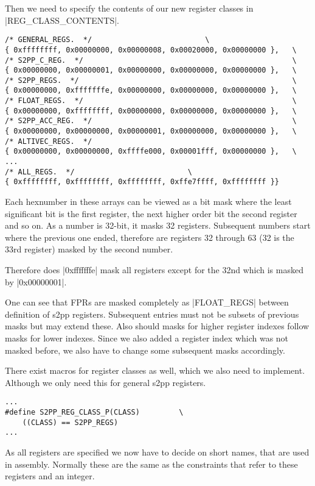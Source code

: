 Then we need to specify the contents of our new register classes in |REG_CLASS_CONTENTS|.
\begin{lstlisting}
/* GENERAL_REGS.  */                          \
{ 0xffffffff, 0x00000000, 0x00000008, 0x00020000, 0x00000000 },   \
/* S2PP_C_REG.  */                                                \
{ 0x00000000, 0x00000001, 0x00000000, 0x00000000, 0x00000000 },   \
/* S2PP_REGS.  */                                                 \
{ 0x00000000, 0xfffffffe, 0x00000000, 0x00000000, 0x00000000 },   \
/* FLOAT_REGS.  */                                                \
{ 0x00000000, 0xffffffff, 0x00000000, 0x00000000, 0x00000000 },   \
/* S2PP_ACC_REG.  */                                              \
{ 0x00000000, 0x00000000, 0x00000001, 0x00000000, 0x00000000 },   \
/* ALTIVEC_REGS.  */
{ 0x00000000, 0x00000000, 0xffffe000, 0x00001fff, 0x00000000 },   \
...
/* ALL_REGS.  */                          \
{ 0xffffffff, 0xffffffff, 0xffffffff, 0xffe7ffff, 0xffffffff }}
\end{lstlisting}

Each hexnumber in these arrays can be viewed as a bit mask where the least significant bit is the first register, the next higher order bit the second register and so on.
As a number is 32-bit, it masks 32 registers.
Subsequent numbers start where the previous one ended, therefore are registers 32 through 63 (32 is the 33rd register) masked by the second number.

Therefore does |0xfffffffe| mask all registers except for the 32nd which is masked by |0x00000001|.

One can see that FPRs are masked completely as |FLOAT_REGS| between definition of s2pp registers.
Subsequent entries must not be subsets of previous masks but may extend these.
Also should masks for higher register indexes follow masks for lower indexes.
Since we also added a register index which was not masked before, we also have to change some subsequent masks accordingly.

There exist macros for register classes as well, which we also need to implement.
Although we only need this for general s2pp registers.
\begin{lstlisting}
...
#define S2PP_REG_CLASS_P(CLASS)         \
    ((CLASS) == S2PP_REGS)
...
\end{lstlisting}

As all registers are specified we now have to decide on short names, that are used in assembly.
Normally these are the same as the constraints that refer to these registers and an integer.

